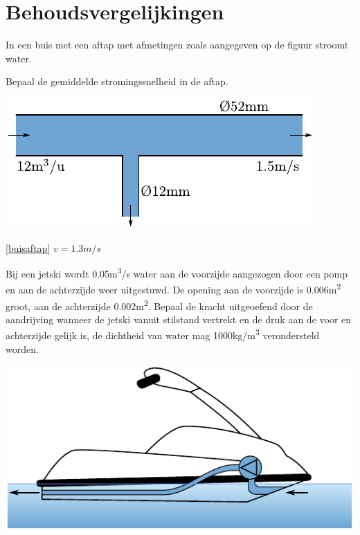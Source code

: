 \chapter{Behoudsvergelijkingen}
\label{sec:Behoudsvergelijkingen}
\begin{toepassing}
	\label{buisaftap}
In een buis met een aftap met afmetingen zoals aangegeven op de figuur stroomt water.
		
Bepaal de gemiddelde stromingssnelheid in de aftap.

	\centering
	\includegraphics{fig/behoudsvergelijkingen/buisaftap}
\end{toepassing}
\begin{antwoord}{\ref{buisaftap}}
	$v = 1.3\unit{m/s}$
\end{antwoord}
\vfill
\begin{toepassing}
	\label{jetski}
Bij een jetski wordt 0.05\unit{m^3/s} water aan de voorzijde aangezogen door een pomp en aan de achterzijde weer uitgestuwd. De opening aan de voorzijde is 0.006\unit{m^2} groot, aan de achterzijde 0.002\unit{m^2}. Bepaal de kracht uitgeoefend door de aandrijving wanneer de jetski vanuit stilstand vertrekt en de druk aan de voor en achterzijde gelijk is, de dichtheid van water mag 1000\unit{kg/m^3} verondersteld worden.

	\centering
	\includegraphics{fig/behoudsvergelijkingen/jetski}
\end{toepassing}
